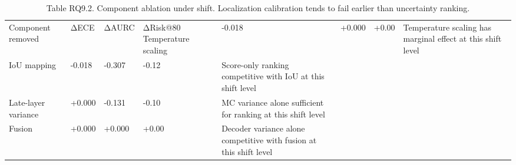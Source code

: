 \begin{table}
\caption{Table RQ9.2. Component ablation under shift. Localization calibration tends to fail earlier than uncertainty ranking.}
\label{tab:rq9_2}
\begin{tabular}{lllll}
\toprule
Component removed & ΔECE & ΔAURC & ΔRisk@80%
\midrule
Temperature scaling & -0.018 & +0.000 & +0.00 & Temperature scaling has marginal effect at this shift level \\
IoU mapping & -0.018 & -0.307 & -0.12 & Score-only ranking competitive with IoU at this shift level \\
Late-layer variance & +0.000 & -0.131 & -0.10 & MC variance alone sufficient for ranking at this shift level \\
Fusion & +0.000 & +0.000 & +0.00 & Decoder variance alone competitive with fusion at this shift level \\
\bottomrule
\end{tabular}
\end{table}
